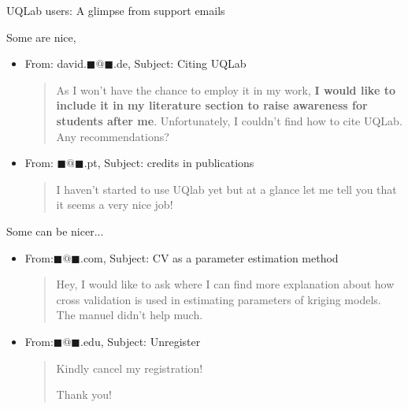\documentclass[]{rsuqbeamernew}
\begin{document}
\begin{frame}{UQLab users: A glimpse from support emails}

Some are nice,
\begin{itemize}
  \item From: david.$\blacksquare@\blacksquare$.de, Subject: Citing UQLab
  \begin{quotation}
    As I won't have the chance to employ it in my work, \textbf{I would like to include it in my literature section to raise awareness for students after me}. Unfortunately, I couldn't find how to cite UQLab. Any recommendations?
  \end{quotation}
  \item From: $\blacksquare@\blacksquare$.pt, Subject: credits in publications
  \begin{quotation}
    I haven't started to use UQlab yet but at a glance let me tell you that it seems a very nice job!
  \end{quotation}
\end{itemize}

Some can be nicer...
\begin{itemize}
  \item From:$\blacksquare@\blacksquare$.com, Subject: CV as a parameter estimation method
  \begin{quotation}
    Hey, 
    I would like to ask where I can find more explanation about how cross validation is used in estimating parameters of kriging models. The manuel didn't help much. 
  \end{quotation}
  \item From:$\blacksquare@\blacksquare$.edu, Subject: Unregister
  \begin{quotation}
    Kindly cancel my registration!
    
    Thank you!
  \end{quotation}
\end{itemize}

\end{frame}
\end{document}
